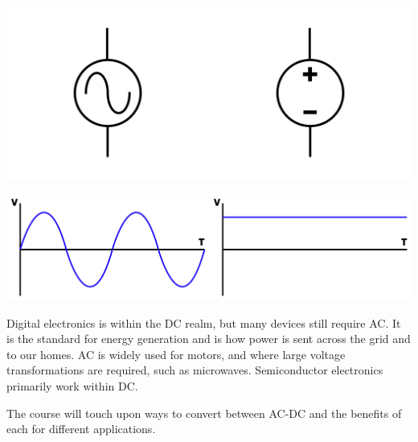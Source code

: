 \documentclass[a4paper,11pt]{report}
\begin{document}
\includegraphics[width=0.5\textwidth]{acsource1}\includegraphics[width=0.5\textwidth]{dcsource1}

\includegraphics[width=0.5\textwidth]{acwave}\includegraphics[width=0.5\textwidth]{dcwave}

Digital electronics is within the DC realm, but many devices still require AC. It is the standard for energy generation and is how power is sent across the grid and to our homes. AC is widely used for motors, and where large voltage transformations are required, such as microwaves. Semiconductor electronics primarily work within DC.

The course will touch upon ways to convert between AC-DC and the benefits of each for different applications.
\end{document}
